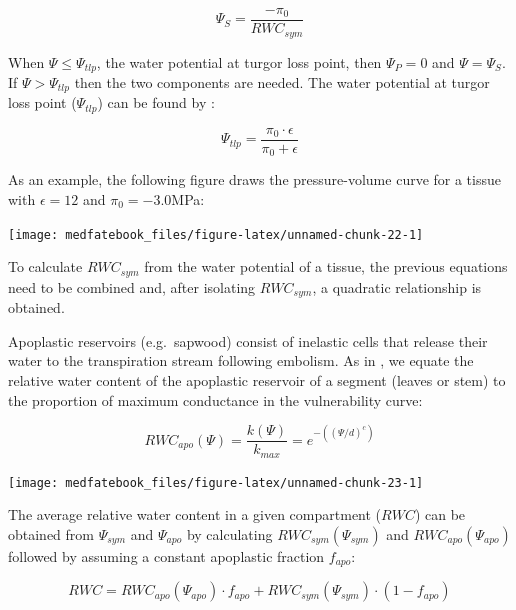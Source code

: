 \documentclass[]{book}
\begin{document}
\begin{equation}
\Psi_{S} = \frac{-\pi_0}{RWC_{sym}} 
\end{equation}

When \(\Psi \leq \Psi_{tlp}\), the water potential at turgor loss point,
then \(\Psi_{P} = 0\) and \(\Psi = \Psi_{S}\). If \(\Psi > \Psi_{tlp}\)
then the two components are needed. The water potential at turgor loss
point (\(\Psi_{tlp}\)) can be found by \citep{Bartlett2012}:

\begin{equation}
\Psi_{tlp} = \frac{\pi_0 \cdot \epsilon}{\pi_0 + \epsilon}
\end{equation}

As an example, the following figure draws the pressure-volume curve for
a tissue with \(\epsilon = 12\) and \(\pi_0 = -3.0\)MPa:

\begin{center}\texttt{[image: medfatebook\_files/figure-latex/unnamed-chunk-22-1]} \end{center}

To calculate \(RWC_{sym}\) from the water potential of a tissue, the
previous equations need to be combined and, after isolating
\(RWC_{sym}\), a quadratic relationship is obtained.

Apoplastic reservoirs (e.g.~sapwood) consist of inelastic cells that
release their water to the transpiration stream following embolism. As
in \citet{Holtta2009}, we equate the relative water content of the
apoplastic reservoir of a segment (leaves or stem) to the proportion of
maximum conductance in the vulnerability curve:

\begin{equation}
RWC_{apo}(\Psi) = \frac{k(\Psi)}{k_{max}} = e^{-((\Psi/d)^{c})}
\end{equation}

\begin{center}\texttt{[image: medfatebook\_files/figure-latex/unnamed-chunk-23-1]} \end{center}

The average relative water content in a given compartment (\(RWC\)) can
be obtained from \(\Psi_{sym}\) and \(\Psi_{apo}\) by calculating
\(RWC_{sym}(\Psi_{sym})\) and \(RWC_{apo}(\Psi_{apo})\) followed by
assuming a constant apoplastic fraction \(f_{apo}\):

\begin{equation}
RWC = RWC_{apo}(\Psi_{apo}) \cdot f_{apo} + RWC_{sym}(\Psi_{sym}) \cdot (1 - f_{apo})
\end{equation}
\end{document}
